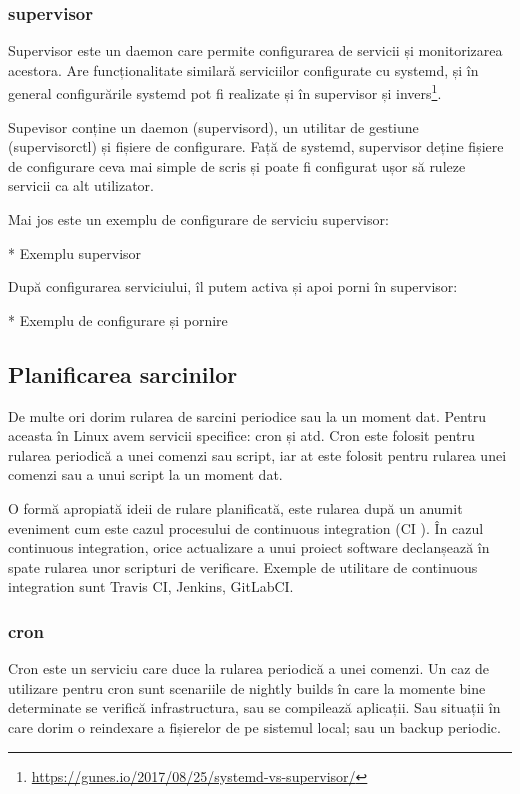 \subsubsection{supervisor}
\label{sec:script-infosys-services-supervisor}

Supervisor este un daemon care permite configurarea de servicii și monitorizarea
acestora. Are funcționalitate similară serviciilor configurate cu systemd, și în
general configurările systemd pot fi realizate și în supervisor și
invers\footnote{\url{https://gunes.io/2017/08/25/systemd-vs-supervisor/}}.

Supevisor conține un daemon (supervisord), un utilitar de gestiune
(supervisorctl) și fișiere de configurare. Față de systemd, supervisor deține
fișiere de configurare ceva mai simple de scris și poate fi configurat ușor să
ruleze servicii ca alt utilizator.

Mai jos este un exemplu de configurare de serviciu supervisor:

* Exemplu supervisor

După configurarea serviciului, îl putem activa și apoi porni în supervisor:

* Exemplu de configurare și pornire

\subsection{Planificarea sarcinilor}
\label{sec:script-infosys-planning}

De multe ori dorim rularea de sarcini periodice sau la un moment dat. Pentru
aceasta în Linux avem servicii specifice: cron și atd. Cron este folosit pentru
rularea periodică a unei comenzi sau script, iar at este folosit pentru rularea
unei comenzi sau a unui script la un moment dat.

O formă apropiată ideii de rulare planificată, este rularea după un anumit
eveniment cum este cazul procesului de continuous integration (CI
). În cazul continuous integration, orice
actualizare a unui proiect software declanșează în spate rularea unor scripturi
de verificare. Exemple de utilitare de continuous integration sunt Travis CI,
Jenkins, GitLabCI.

\subsubsection{cron}
\label{sec:script-infosys-planning-cron}

Cron este un serviciu care duce la rularea periodică a unei comenzi. Un caz de
utilizare pentru cron sunt scenariile de nightly builds în care la momente bine
determinate se verifică infrastructura, sau se compilează aplicații. Sau
situații în care dorim o reindexare a fișierelor de pe sistemul local; sau un
backup periodic.

